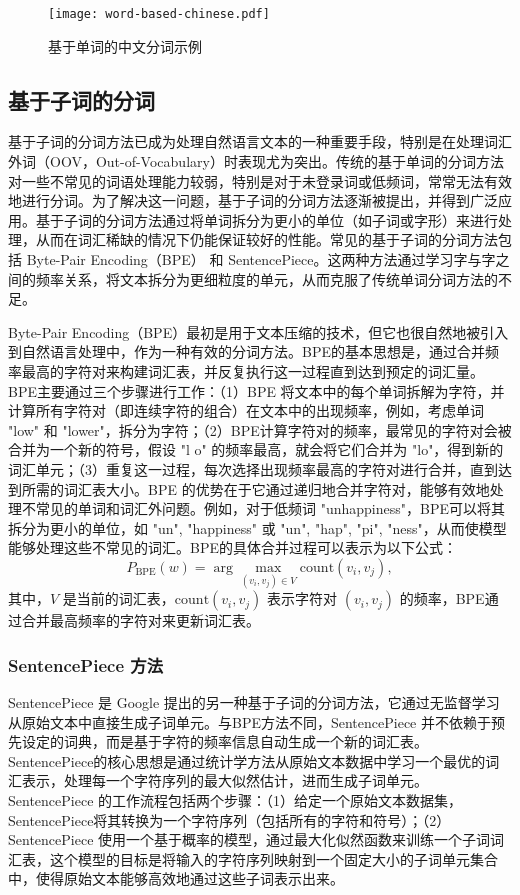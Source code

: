 \begin{figure}[ht]
  \centering
  \texttt{[image: word-based-chinese.pdf]}
  \caption{基于单词的中文分词示例}
  \label{word-based-chinese}
\end{figure}

\subsection{基于子词的分词}

基于子词的分词方法已成为处理自然语言文本的一种重要手段，特别是在处理词汇外词（OOV，Out-of-Vocabulary）时表现尤为突出。传统的基于单词的分词方法对一些不常见的词语处理能力较弱，特别是对于未登录词或低频词，常常无法有效地进行分词。为了解决这一问题，基于子词的分词方法逐渐被提出，并得到广泛应用。基于子词的分词方法通过将单词拆分为更小的单位（如子词或字形）来进行处理，从而在词汇稀缺的情况下仍能保证较好的性能。常见的基于子词的分词方法包括 Byte-Pair Encoding（BPE） 和 SentencePiece。这两种方法通过学习字与字之间的频率关系，将文本拆分为更细粒度的单元，从而克服了传统单词分词方法的不足。

Byte-Pair Encoding（BPE）最初是用于文本压缩的技术，但它也很自然地被引入到自然语言处理中，作为一种有效的分词方法。BPE的基本思想是，通过合并频率最高的字符对来构建词汇表，并反复执行这一过程直到达到预定的词汇量。BPE主要通过三个步骤进行工作：（1）BPE 将文本中的每个单词拆解为字符，并计算所有字符对（即连续字符的组合）在文本中的出现频率，例如，考虑单词 "low" 和 "lower"，拆分为字符；（2）BPE计算字符对的频率，最常见的字符对会被合并为一个新的符号，假设 "l o" 的频率最高，就会将它们合并为 "lo"，得到新的词汇单元；（3）重复这一过程，每次选择出现频率最高的字符对进行合并，直到达到所需的词汇表大小。BPE 的优势在于它通过递归地合并字符对，能够有效地处理不常见的单词和词汇外问题。例如，对于低频词 "unhappiness"，BPE可以将其拆分为更小的单位，如 "un", "happiness" 或 "un", "hap", "pi", "ness"，从而使模型能够处理这些不常见的词汇。BPE的具体合并过程可以表示为以下公式：
\begin{equation}
    P_{\text{BPE}}(w) = \arg\max_{(v_i, v_j) \in V} \text{count}(v_i, v_j),
\end{equation}
其中，$V$ 是当前的词汇表，$\text{count}(v_i, v_j)$ 表示字符对 $(v_i, v_j)$ 的频率，BPE通过合并最高频率的字符对来更新词汇表。

\subsubsection{SentencePiece 方法}

SentencePiece 是 Google 提出的另一种基于子词的分词方法，它通过无监督学习从原始文本中直接生成子词单元。与BPE方法不同，SentencePiece 并不依赖于预先设定的词典，而是基于字符的频率信息自动生成一个新的词汇表。SentencePiece的核心思想是通过统计学方法从原始文本数据中学习一个最优的词汇表示，处理每一个字符序列的最大似然估计，进而生成子词单元。SentencePiece 的工作流程包括两个步骤：（1）给定一个原始文本数据集，SentencePiece将其转换为一个字符序列（包括所有的字符和符号）；（2）SentencePiece 使用一个基于概率的模型，通过最大化似然函数来训练一个子词词汇表，这个模型的目标是将输入的字符序列映射到一个固定大小的子词单元集合中，使得原始文本能够高效地通过这些子词表示出来。

